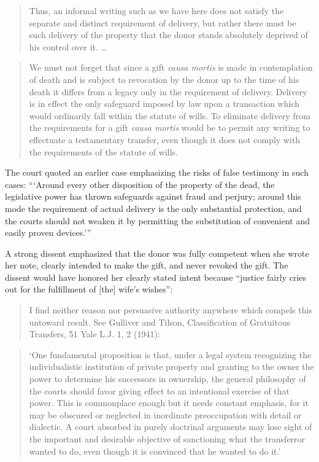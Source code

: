 \begin{quote}
Thus, an informal writing such as we have here does not satisfy the separate and
distinct requirement of delivery, but rather there must be such delivery of the
property that the donor stands absolutely deprived of his control over it.
\dots{}
\end{quote}

\begin{quote}
We must not forget that since a gift \textit{causa mortis} is made in
contemplation of death and is subject to revocation by the donor up to the time
of his death it differs from a legacy only in the requirement of delivery.
Delivery is in effect the only safeguard imposed by law upon a transaction
which would ordinarily fall within the statute of wills. To eliminate delivery
from the requirements for a gift \textit{causa mortis} would be to permit any
writing to effectuate a testamentary transfer, even though it does not comply
with the requirements of the statute of wills.
\end{quote}

The court quoted an earlier case emphasizing the risks of false testimony in
such cases: ``{}`Around every other disposition of the property of the dead,
the legislative power has thrown safeguards against fraud and perjury; around
this mode the requirement of actual delivery is the only substantial
protection, and the courts should not weaken it by permitting the substitution
of convenient and easily proven devices.'{}''

A strong dissent emphasized that the donor was fully competent when she wrote
her note, clearly intended to make the gift, and never revoked the gift.  The
dissent would have honored her clearly stated intent because ``justice fairly
cries out for the fulfillment of [the] wife's wishes'':

\begin{quote}
I find neither reason nor persuasive authority anywhere which compels this
untoward result. See Gulliver and Tilson, Classification of Gratuitous
Transfers, 51 Yale L.J. 1, 2 (1941):
\end{quote}

\begin{quote}
{}`One fundamental proposition is that, under a legal system recognizing the
individualistic institution of private property and granting to the owner the
power to determine his successors in ownership, the general philosophy of the
courts should favor giving effect to an intentional exercise of that power.
This is commonplace enough but it needs constant emphasis, for it may be
obscured or neglected in inordinate preoccupation with detail or dialectic. A
court absorbed in purely doctrinal arguments may lose sight of the important
and desirable objective of sanctioning what the transferror wanted to do, even
though it is convinced that he wanted to do it.'
\end{quote}

